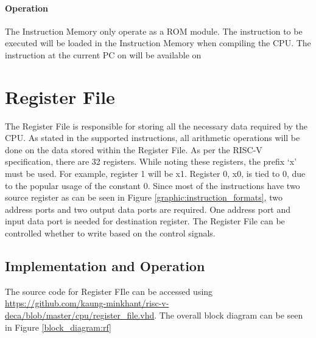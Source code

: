 \paragraph*{Operation}
The Instruction Memory only operate as a ROM module.
The instruction to be executed will be loaded in the Instruction Memory when compiling the CPU.
The instruction at the current PC on  will be available on 

\section{Register File}
The Register File is responsible for storing all the necessary data required by the CPU.
As stated in the supported instructions, all arithmetic operations will be done on the data stored within the Register File.
As per the RISC-V specification, there are 32 registers. While noting these registers, the prefix `x' must be used.
For example, register 1 will be x1. Register 0, x0, is tied to 0, due to the popular usage of the constant 0.
Since most of the instructions have two source register as can be seen in Figure \ref{graphic:instruction_formats}, two address ports and two output data ports are required.
One address port and input data port is needed for destination register. The Register File can be controlled whether to write based on the control signals.

\subsection{Implementation and Operation}
The source code for Register FIle
can be accessed using \url{https://github.com/kaung-minkhant/risc-v-deca/blob/master/cpu/register_file.vhd}.
The overall block diagram can be seen in Figure \ref{block_diagram:rf}

